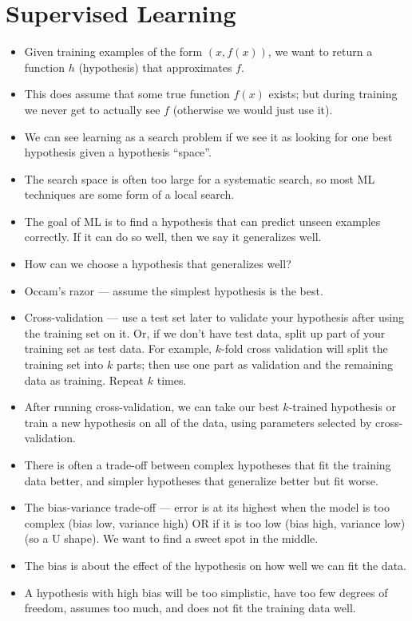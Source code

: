 \documentclass{article}
\begin{document}
\section{Supervised Learning}
\begin{itemize}
    \item Given training examples of the form $(x, f(x))$, we want to return a function $h$ (hypothesis) that approximates $f$.
    \item This does assume that some true function $f(x)$ exists; but during training we never get to actually see $f$ (otherwise we would just use it).
    \item We can see learning as a search problem if we see it as looking for one best hypothesis given a hypothesis ``space''.
    \item The search space is often too large for a systematic search, so most ML techniques are some form of a local search.
    \item The goal of ML is to find a hypothesis that can predict unseen examples correctly.  If it can do so well, then we say it generalizes well.
    \item How can we choose a hypothesis that generalizes well?
    \item Occam's razor --- assume the simplest hypothesis is the best.
    \item Cross-validation --- use a test set later to validate your hypothesis after using the training set on it.  Or, if we don't have test data, split up part of your training set as test data.  For example, $k$-fold cross validation will split the training set into $k$ parts; then use one part as validation and the remaining data as training.  Repeat $k$ times.
    \item After running cross-validation, we can take our best $k$-trained hypothesis or train a new hypothesis on all of the data, using parameters selected by cross-validation.
    \item There is often a trade-off between complex hypotheses that fit the training data better, and simpler hypotheses that generalize better but fit worse.
    \item The bias-variance trade-off --- error is at its highest when the model is too complex (bias low, variance high) OR if it is too low (bias high, variance low) (so a U shape).  We want to find a sweet spot in the middle.
    \item The bias is about the effect of the hypothesis on how well we can fit the data.
    \item A hypothesis with high bias will be too simplistic, have too few degrees of freedom, assumes too much, and does not fit the training data well.

\end{itemize}
\end{document}
